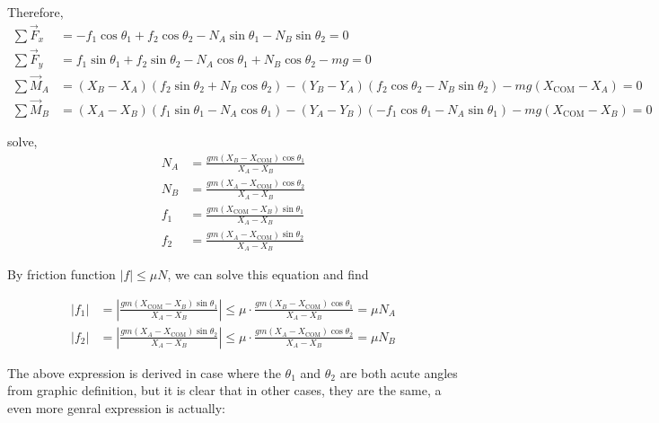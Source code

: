 \documentclass[11pt]{article}
\newtheorem{note}[statement]{Note}
\begin{document}
Therefore,
\begin{align*}
    \sum \vec{F}_x &= -f_1 \cos\theta_1 + f_2 \cos\theta_2 
                     - N_A \sin\theta_1 - N_B \sin\theta_2 = 0 \\
    \sum \vec{F}_y &= f_1 \sin\theta_1 + f_2 \sin\theta_2 
                     - N_A \cos\theta_1 + N_B \cos\theta_2 - mg = 0 \\[1ex]
    \sum \vec{M}_A &= (X_B - X_A)(f_2 \sin\theta_2 + N_B \cos\theta_2)
                     - (Y_B - Y_A)(f_2 \cos\theta_2 - N_B \sin\theta_2)
                     - mg (X_{\text{COM}} - X_A) = 0 \\
    \sum \vec{M}_B &= (X_A - X_B)(f_1 \sin\theta_1 - N_A \cos\theta_1)
                     - (Y_A - Y_B)(-f_1 \cos\theta_1 - N_A \sin\theta_1)
                     - mg (X_{\text{COM}} - X_B) = 0
\end{align*}

solve,
\begin{align*}
    N_A &= \frac{g m (X_B - X_{\text{COM}}) \cos\theta_1}{X_A - X_B} \\[1ex]
    N_B &= \frac{g m (X_A - X_{\text{COM}}) \cos\theta_2}{X_A - X_B} \\[1ex]
    f_1 &= \frac{g m (X_{\text{COM}} - X_B) \sin\theta_1}{X_A - X_B} \\[1ex]
    f_2 &= \frac{g m (X_A - X_{\text{COM}}) \sin\theta_2}{X_A - X_B}
\end{align*}
    
By friction function \(\left| f \right| \leq \mu N\), we can solve this equation and find 

\begin{align*}
    \left| f_1 \right| &= \left| \frac{g m (X_{\text{COM}} - X_B) \sin\theta_1}{X_A - X_B} \right| 
    \leq \mu \cdot \frac{g m (X_B - X_{\text{COM}}) \cos\theta_1}{X_A - X_B} = \mu N_A \\[1.5ex]
    \left| f_2 \right| &= \left| \frac{g m (X_A - X_{\text{COM}}) \sin\theta_2}{X_A - X_B} \right| 
    \leq \mu \cdot \frac{g m (X_A - X_{\text{COM}}) \cos\theta_2}{X_A - X_B} = \mu N_B
\end{align*}

    The above expression is derived in case where the \(\theta_1\) and \(\theta_2\) are both acute angles from graphic
    definition, but it is clear that in other cases, they are the same, a even more genral expression is actually:
    
\end{document}
